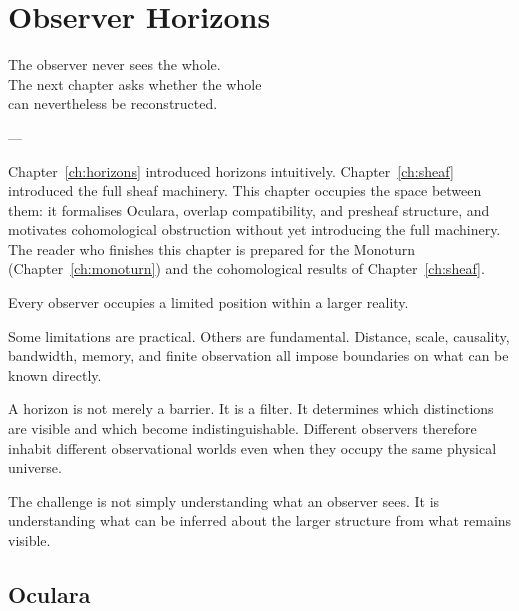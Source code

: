 
\chapter{Observer Horizons}
\label{ch:observer-horizons}

\epigraph{%
  The observer never sees the whole.\\
  The next chapter asks whether the whole\\
  can nevertheless be reconstructed.%
}{---}

\begin{WhyChapter}
  Chapter~\ref{ch:horizons} introduced horizons intuitively.
  Chapter~\ref{ch:sheaf} introduced the full sheaf machinery.
  This chapter occupies the space between them: it formalises
  Oculara, overlap compatibility, and presheaf structure,
  and motivates cohomological obstruction without yet
  introducing the full machinery.
  The reader who finishes this chapter is prepared for the
  Monoturn (Chapter~\ref{ch:monoturn}) and the cohomological
  results of Chapter~\ref{ch:sheaf}.
\end{WhyChapter}


\begin{ChapterIntro}
Every observer occupies a limited position within a larger reality.

Some limitations are practical. Others are fundamental. Distance, scale, causality, bandwidth, memory, and finite observation all impose boundaries on what can be known directly.

A horizon is not merely a barrier. It is a filter. It determines which distinctions are visible and which become indistinguishable. Different observers therefore inhabit different observational worlds even when they occupy the same physical universe.

The challenge is not simply understanding what an observer sees. It is understanding what can be inferred about the larger structure from what remains visible.
\end{ChapterIntro}

\section{Oculara}

